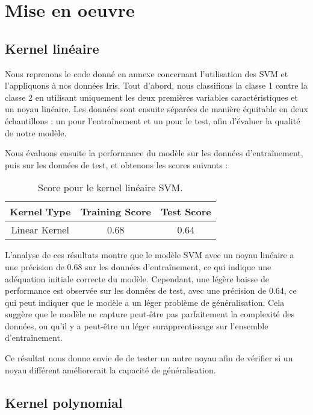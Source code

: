 \documentclass{article}
\begin{document}
\section{Mise en oeuvre}

\subsection{Kernel linéaire}

Nous reprenons le code donné en annexe concernant l'utilisation des SVM et l'appliquons à nos données Iris. Tout d'abord, nous classifions la classe 1 contre la classe 2 en utilisant uniquement les deux premières variables caractéristiques et un noyau linéaire. Les données sont ensuite séparées de manière équitable en deux échantillons : un pour l'entraînement et un pour le test, afin d'évaluer la qualité de notre modèle.

Nous évaluons ensuite la performance du modèle sur les données d'entraînement, puis sur les données de test, et obtenons les scores suivants :

\begin{table}[ht]
\centering
\begin{tabular}{|c|c|c|}
\hline
\textbf{Kernel Type} & \textbf{Training Score} & \textbf{Test Score} \\ \hline
Linear Kernel        & 0.68                    & 0.64                \\ \hline
\end{tabular}
\caption{Score pour le kernel linéaire SVM.}
\label{tab:linear_kernel_results}
\end{table}
L'analyse de ces résultats montre que le modèle SVM avec un noyau linéaire a une précision de 0.68 sur les données d'entraînement, ce qui indique une adéquation initiale correcte du modèle. Cependant, une légère baisse de performance est observée sur les données de test, avec une précision de 0.64, ce qui peut indiquer que le modèle a un léger problème de généralisation. Cela suggère que le modèle ne capture peut-être pas parfaitement la complexité des données, ou qu'il y a peut-être un léger surapprentissage sur l'ensemble d'entraînement. 

Ce résultat nous donne envie de de tester un autre noyau afin de vérifier si un noyau différent améliorerait la capacité de généralisation.

\subsection{Kernel polynomial}
\end{document}
